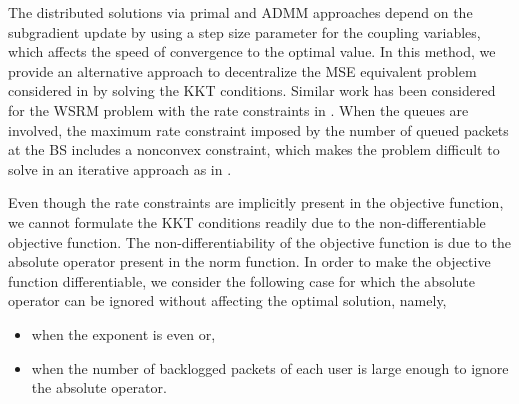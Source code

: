 
The distributed solutions via primal and \ac{ADMM} approaches depend on the subgradient update by using a step size parameter for the coupling variables, which affects the speed of convergence to the optimal value. In this method, we provide an alternative approach to decentralize the \ac{MSE} equivalent problem considered in \cite{christensen2008weighted,wmmse_shi} by solving the \ac{KKT} conditions. Similar work has been considered for the \ac{WSRM} problem with the rate constraints in \cite{kaleva2012weighted}. When the queues are involved, the maximum rate constraint imposed by the number of queued packets at the \ac{BS} includes a nonconvex constraint, which makes the problem difficult to solve in an iterative approach as in \cite{kaleva2012weighted}.

Even though the rate constraints are implicitly present in the objective function, we cannot formulate the \ac{KKT} conditions readily due to the non-differentiable objective function. The non-differentiability of the objective function is due to the absolute operator present in the norm function. In order to make the objective function differentiable, we consider the following case for which the absolute operator can be ignored without affecting the optimal solution, namely,
\begin{itemize}
\item when the exponent  is even or,
\item when the number of backlogged packets of each user is large enough  to ignore the absolute operator.
\end{itemize}

